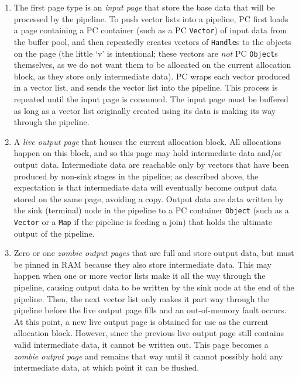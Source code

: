 \begin{enumerate}

\item The first page type is an \emph{input page} that store the base data that will be processed by the pipeline.
To push vector lists into a pipeline, PC first loads a page containing a PC container (such as a PC \texttt{Vector}) of 
input data from the buffer pool, and then repeatedly creates vectors of \texttt{Handle}s to the objects on
the page (the little `v' is intentional; these vectors are \emph{not} PC \texttt{Object}s themselves, as we do not want them to be allocated
on the current  allocation block, as they store only intermediate data).  PC wraps
each vector produced in a vector list, and sends the vector list into the pipeline.  This process is repeated until the input page is consumed.
The input page must be buffered as long as a vector list originally created using its data is making its way through the pipeline.  

\item A \emph{live output page} that houses the current allocation block.  All allocations happen on this block, and so this page may hold intermediate data
and/or output data.
Intermediate data are 
reachable only by vectors that have been produced
by non-sink stages in the pipeline; as described above, the expectation is that intermediate data will eventually become output data stored on the
same page, avoiding a copy.  Output data are
data written by the sink (terminal) node in the pipeline to a PC container 
\texttt{Object} (such as a \texttt{Vector} or a \texttt{Map} if the pipeline is feeding a join) that holds the ultimate output
of the pipeline.

\item Zero or one \emph{zombie output pages} that are full and store output data, but must
be pinned in RAM because they also store intermediate data.  This may happen when one or more vector lists make it all the way through the pipeline,
causing output data to be written by 
the sink node at the end of the pipeline.  Then, the next vector list only makes it part way through the pipeline before the live
output page
fills and an out-of-memory fault occurs.  
At this point, a new live output page is obtained for use
as the current allocation block.  However, since the previous live output page still contains valid intermediate data, it cannot be written out.  This 
page becomes a \emph{zombie output page} and remains that way until it cannot possibly hold any intermediate data, at which point it can be flushed.


\end{enumerate}
